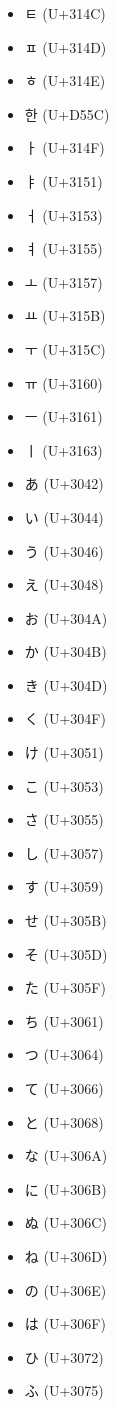\documentclass[a4paper]{article}
\begin{document}
\begin{itemize}
    \item ㅌ (U+314C)
    \item ㅍ (U+314D)
    \item ㅎ (U+314E)
    \item 한 (U+D55C)
    \item ㅏ (U+314F)
    \item ㅑ (U+3151)
    \item ㅓ (U+3153)
    \item ㅕ (U+3155)
    \item ㅗ (U+3157)
    \item ㅛ (U+315B)
    \item ㅜ (U+315C)
    \item ㅠ (U+3160)
    \item ㅡ (U+3161)
    \item ㅣ (U+3163)
    \item あ (U+3042)
    \item い (U+3044)
    \item う (U+3046)
    \item え (U+3048)
    \item お (U+304A)
    \item か (U+304B)
    \item き (U+304D)
    \item く (U+304F)
    \item け (U+3051)
    \item こ (U+3053)
    \item さ (U+3055)
    \item し (U+3057)
    \item す (U+3059)
    \item せ (U+305B)
    \item そ (U+305D)
    \item た (U+305F)
    \item ち (U+3061)
    \item つ (U+3064)
    \item て (U+3066)
    \item と (U+3068)
    \item な (U+306A)
    \item に (U+306B)
    \item ぬ (U+306C)
    \item ね (U+306D)
    \item の (U+306E)
    \item は (U+306F)
    \item ひ (U+3072)
    \item ふ (U+3075)

\end{itemize}
\end{document}
